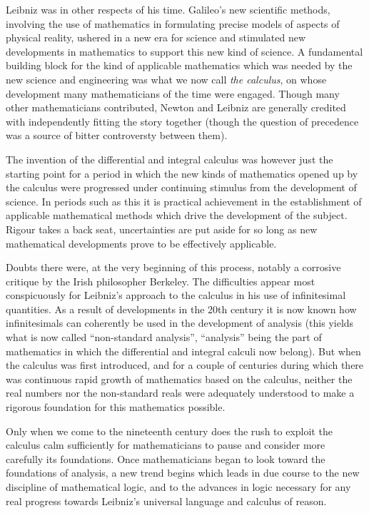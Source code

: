 \documentclass[10pt,titlepage]{book}
\begin{document}
Leibniz was in other respects of his time.
Galileo's new scientific methods, involving the use of mathematics in formulating precise models of aspects of physical reality, ushered in a new era for science and stimulated new developments in mathematics to support this new kind of science.
A fundamental building block for the kind of applicable mathematics which was needed by the new science and engineering was what we now call {\it the calculus}, on whose development many mathematicians of the time were engaged.
Though many other mathematicians contributed, Newton and Leibniz are generally credited with independently fitting the story together (though the question of precedence was a source of bitter controversty between them).

The invention of the differential and integral calculus was however just the starting point for a period in which the new kinds of mathematics opened up by the calculus were progressed under continuing stimulus from the development of science.
In periods such as this it is practical achievement in the establishment of applicable mathematical methods which drive the development of the subject.
Rigour takes a back seat, uncertainties are put aside for so long as new mathematical developments prove to be effectively applicable.

Doubts there were, at the very beginning of this process, notably a corrosive critique by the Irish philosopher Berkeley.
The difficulties appear most conspicuously for Leibniz's approach to the calculus in his use of infinitesimal quantities.
As a result of developments in the 20th century it is now known how infinitesimals can coherently be used in the development of analysis (this yields what is now called ``non-standard analysis'', ``analysis'' being the part of mathematics in which the differential and integral calculi now belong). 
But when the calculus was first introduced, and for a couple of centuries during which there was continuous rapid growth of mathematics based on the calculus, neither the real numbers nor the non-standard reals were adequately understood to make a rigorous foundation for this mathematics possible. 

Only when we come to the nineteenth century does the rush to exploit the calculus calm sufficiently for mathematicians to pause and consider more carefully its foundations.
Once mathematicians began to look toward the foundations of analysis, a new trend begins which leads in due course to the new discipline of mathematical logic, and to the advances in logic necessary for any real progress towards Leibniz's universal language and calculus of reason.
\end{document}
